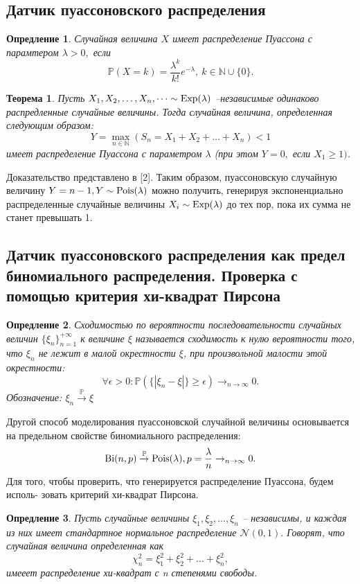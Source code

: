 \documentclass[11pt]{article}
\newtheorem{theorem}{Теорема}
\newtheorem{definition}{Опредление}
\newcommand{\bi}{\normalfont{\text{Bi}}}
\newcommand{\expon}{\normalfont{\text{Exp}}}
\newcommand{\pois}{\normalfont{\text{Pois}}}
\numberwithin{equation}{section}
\begin{document}
\subsection{Датчик пуассоновского распределения}
\begin{definition}
  Случайная величина $X$ имеет распределение Пуассона с парамтером $\lambda > 0,$ если
  $$\mathbb{P}(X=k) = \frac{\lambda^k}{k!}e^{-\lambda}, \ k \in \mathbb{N} \cup \{0\}.$$
\end{definition}
\begin{theorem}
  Пусть $X_1,X_2, \dots, X_n, \dots \sim \expon(\lambda)$ --независимые одинаково распредленные случайные величины. Тогда случайная величина, определенная следующим образом:
  $$Y = \max_{n \in \mathbb{N}} (S_n = X_1 + X_2+ \dots + X_n) < 1$$
  имеет распределение Пуассона с параметром $\lambda$ (при этом $Y = 0,$ если $ X_1\geq 1)$.
\end{theorem}

  Доказательство представлено в [2]. Таким образом, пуассоновскую случайную величину 
  $Y = n-1, Y \sim \pois(\lambda)$ можно получить, генерируя экспоненциально распределенные случайные величины $X_i \sim \expon(\lambda)$ до тех пор, пока их сумма не станет превышать 1.
\subsection{Датчик пуассоновского распределения как предел биномиального распределения. Проверка с помощью критерия хи-квадрат Пирсона}
\begin{definition}
  Сходимостью по вероятности последовательности случайных величин $\{\xi_n\}_{n=1}^{+\infty}$ к величине $\xi$ называется
  сходимость к нулю вероятности того, что $\xi_n$ не лежит в малой окрестности $\xi$, при произвольной малости этой окрестности:
  $$\forall \epsilon>0: \mathbb{P}(\{ |\xi_n-\xi|\}\geq \epsilon) \rightarrow_{n \to \infty} 0.$$
  Обозначение:  $\xi_n \overset{\mathbb{P}}{\to} \xi$
\end{definition}
Другой способ моделирования пуассоновской случайной величины основывается на предельном свойстве биномиального распределения:
$$ \bi(n,p) \overset{\mathbb{P}}{\to} \pois(\lambda), p = \frac{\lambda}{n} \to_{n \to \infty} 0.$$
Для того, чтобы проверить, что генерируется распределение Пуассона, будем исполь-
зовать критерий хи-квадрат Пирсона.
\begin{definition}
  Пусть случайные величины $\xi_1, \xi_2, \dots, \xi_n$ -- независимы, и каждая из них имеет стандартное 
  нормальное распределение $\mathcal{N}(0,1).$ Говорят, что случайная величина определенная как
  $$ \chi_n^2 = \xi_1^2+\xi_2^2+\dots+\xi_n^2,$$
  имееет распределение хи-квадрат с n степенями свободы.
\end{definition}
\end{document}
